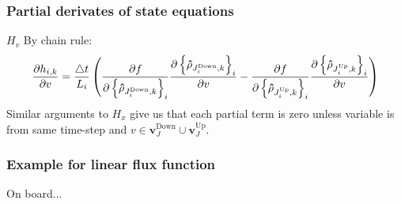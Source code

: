 \begin{frame}[t]\frametitle{Partial derivates of state equations}

\begin{block}{$H_v$}
By chain rule:
\begin{align*}
\frac{\partial h_{i,k}}{\partial v}=\frac{\triangle t}{L_{i}}\left(\frac{\partial f}{\partial\left\{ \mathbf{\hat{\rho}}_{J_{i}^{\text{Down}},k}\right\} _{i}}\frac{\partial\left\{ \mathbf{\hat{\rho}}_{J_{i}^{\text{Down}},k}\right\} _{i}}{\partial v}-\frac{\partial f}{\partial\left\{ \mathbf{\hat{\rho}}_{J_{i}^{\text{Up}},k}\right\} _{i}}\frac{\partial\left\{ \mathbf{\hat{\rho}}_{J_{i}^{\text{Up}},k}\right\} _{i}}{\partial v}\right)
\end{align*}
Similar arguments to $H_x$ give us that each partial term is zero unless variable is from same time-step and $v\in \mathbf{v}_J^{\text{Down}}\cup\mathbf{v}_J^{\text{Up}}$.
\end{block}
\end{frame}

\begin{frame}[t]\frametitle{Example for linear flux function}

\begin{example}
On board...
\end{example}

\end{frame}



